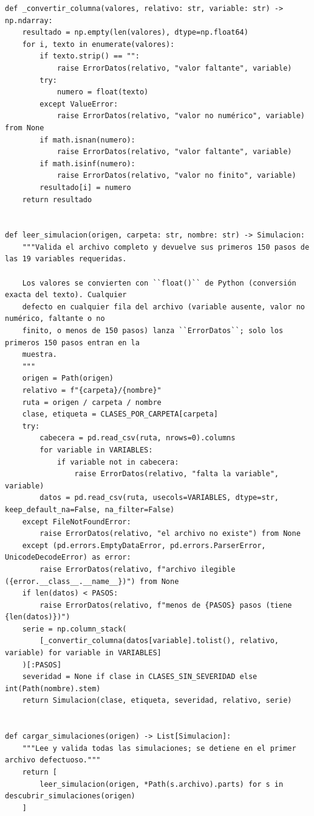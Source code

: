 \documentclass[12pt,a4paper]{article}
\begin{document}
\begin{lstlisting}
def _convertir_columna(valores, relativo: str, variable: str) -> np.ndarray:
    resultado = np.empty(len(valores), dtype=np.float64)
    for i, texto in enumerate(valores):
        if texto.strip() == "":
            raise ErrorDatos(relativo, "valor faltante", variable)
        try:
            numero = float(texto)
        except ValueError:
            raise ErrorDatos(relativo, "valor no numérico", variable) from None
        if math.isnan(numero):
            raise ErrorDatos(relativo, "valor faltante", variable)
        if math.isinf(numero):
            raise ErrorDatos(relativo, "valor no finito", variable)
        resultado[i] = numero
    return resultado


def leer_simulacion(origen, carpeta: str, nombre: str) -> Simulacion:
    """Valida el archivo completo y devuelve sus primeros 150 pasos de las 19 variables requeridas.

    Los valores se convierten con ``float()`` de Python (conversión exacta del texto). Cualquier
    defecto en cualquier fila del archivo (variable ausente, valor no numérico, faltante o no
    finito, o menos de 150 pasos) lanza ``ErrorDatos``; solo los primeros 150 pasos entran en la
    muestra.
    """
    origen = Path(origen)
    relativo = f"{carpeta}/{nombre}"
    ruta = origen / carpeta / nombre
    clase, etiqueta = CLASES_POR_CARPETA[carpeta]
    try:
        cabecera = pd.read_csv(ruta, nrows=0).columns
        for variable in VARIABLES:
            if variable not in cabecera:
                raise ErrorDatos(relativo, "falta la variable", variable)
        datos = pd.read_csv(ruta, usecols=VARIABLES, dtype=str, keep_default_na=False, na_filter=False)
    except FileNotFoundError:
        raise ErrorDatos(relativo, "el archivo no existe") from None
    except (pd.errors.EmptyDataError, pd.errors.ParserError, UnicodeDecodeError) as error:
        raise ErrorDatos(relativo, f"archivo ilegible ({error.__class__.__name__})") from None
    if len(datos) < PASOS:
        raise ErrorDatos(relativo, f"menos de {PASOS} pasos (tiene {len(datos)})")
    serie = np.column_stack(
        [_convertir_columna(datos[variable].tolist(), relativo, variable) for variable in VARIABLES]
    )[:PASOS]
    severidad = None if clase in CLASES_SIN_SEVERIDAD else int(Path(nombre).stem)
    return Simulacion(clase, etiqueta, severidad, relativo, serie)


def cargar_simulaciones(origen) -> List[Simulacion]:
    """Lee y valida todas las simulaciones; se detiene en el primer archivo defectuoso."""
    return [
        leer_simulacion(origen, *Path(s.archivo).parts) for s in descubrir_simulaciones(origen)
    ]
\end{lstlisting}
\end{document}
